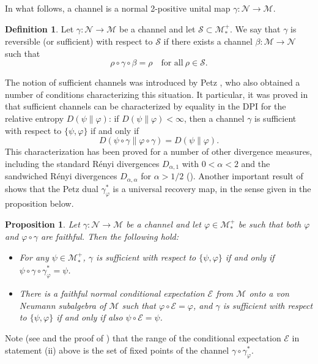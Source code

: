 \documentclass[12pt]{article}
\newtheorem{prop}[theorem]{Proposition}
\theoremstyle{definition}
\newtheorem{defi}[theorem]{Definition}
\theoremstyle{remark}
\numberwithin{equation}{section}
\def\Me{\mathcal M}
\def\Ne{\mathcal N}
\def\ffi{\varphi}
\begin{document}
In what follows, a channel is a normal 2-positive unital map $\gamma: \Ne\to \Me$.

\begin{defi} Let $\gamma:\Ne\to \Me$ be a channel and let $\mathcal S \subset
\Me_*^+$. We say that $\gamma$ is reversible (or sufficient) with respect to $\mathcal S$
if there exists a channel $\beta:\Me\to \Ne$ such that
\[
\rho\circ\gamma\circ\beta=\rho\quad\mbox{for all}\ \rho\in \mathcal S.
\]
\end{defi}

The notion of sufficient channels was introduced by Petz
\cite{petz1986sufficient,petz1988sufficiency}, who also obtained a number of conditions
characterizing this situation. It particular, it was proved in \cite{petz1988sufficiency}
that sufficient channels can be characterized by equality in {the} DPI for the relative entropy
$D(\psi\|\varphi)$: if $D(\psi\|\varphi)<\infty$, then a channel $\gamma$ is sufficient
with respect to $\{\psi,\varphi\}$ if and only if 
\[
D(\psi\circ\gamma\|\varphi\circ\gamma)=D(\psi\|\varphi). 
\]
This characterization has been proved for a number of other divergence measures, including the
standard R\'enyi divergences $D_{\alpha,1}$ with $0<\alpha<2$  and the sandwiched
R\'enyi divergences $D_{\alpha,\alpha}$ for $\alpha>1/2$
(\cite{hiai2021quantum,jencova2018renyi,jencova2021renyi}).
Another important result of \cite{petz1988sufficiency} shows that the Petz dual $\gamma_\varphi^*$
is a universal recovery map, in the sense given in the proposition below. 

\begin{prop}\label{prop:universal}
Let $\gamma:\Ne\to \Me$ be a channel and let $\varphi\in \Me_*^+$ be such that both $\ffi$ and
$\ffi\circ\gamma$ are faithful. Then the following hold:
\begin{itemize}
\item[(i)] For any $\psi\in \Me_*^+$, $\gamma$ is sufficient with respect to $\{\psi,\varphi\}$ if and only
if $\psi\circ\gamma\circ\gamma_\varphi^*=\psi$.

\item[(ii)]
There is a faithful normal conditional expectation $\mathcal E$ from $\Me$ onto a von Neumann
subalgebra of $\Me$ such that $\varphi\circ \mathcal E=\varphi$, and $\gamma$ is sufficient with
respect to $\{\psi,\varphi\}$ if and only if also $\psi\circ\mathcal E=\psi$.
\end{itemize}
\end{prop}

Note {(see \cite[Theorem 2]{petz1988sufficiency} and the proof of
\cite[Theorem 3]{petz1988sufficiency})}
that the range of the conditional expectation $\mathcal E$ in statement (ii) above is the set of
fixed points of the channel $\gamma\circ\gamma_\varphi^*$.
\end{document}
